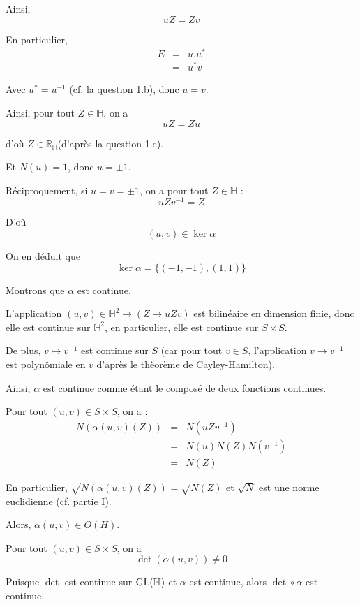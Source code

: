 Ainsi,
\[ u Z = Z v \]


En particulier,
\begin{eqnarray*}
  E & = & u.u^{\ast}\\
  & = & u^{\ast} v
\end{eqnarray*}


Avec $u^{\ast} = u^{- 1}$ (cf. la question 1.b), donc $u = v$.

Ainsi, pour tout $Z \in \mathbb{H}$, on a
\[ u Z = Z u \]


d'o{\`u} $Z \in \mathbb{R}_{\mathbb{H}} $(d'apr{\`e}s la question 1.c).

Et $N (u) = 1$, donc $u = \pm 1$.

R{\'e}ciproquement, si $u = v = \pm 1 $, on a pour tout $Z \in \mathbb{H}$ :
\[ u Z v^{- 1} = Z \]


D'o{\`u}
\[ (u, v) \in \ker \alpha \]


On en d{\'e}duit que
\[ \ker \alpha = \{ (- 1, - 1), (1, 1) \} \]


 Montrons que $\alpha$ est continue.

L'application $(u, v) \in \mathbb{H}^2 \longmapsto (Z \longmapsto u Z v)$ est
bilin{\'e}aire en dimension finie, donc elle est continue sur $\mathbb{H}^2$,
en particulier, elle est continue sur $S \times S$.

De plus, $v \longmapsto v^{- 1}$ est continue sur $S$ (car pour tout $v \in
S$, l'application $v \rightarrow v^{- 1}$ est polyn{\^o}miale en $v$
d'apr{\`e}s le th{\`e}or{\`e}me de Cayley-Hamilton).

Ainsi, $\alpha$ est continue comme {\'e}tant le compos{\'e} de deux fonctions
continues.

Pour tout $(u, v) \in S \times S$, on a :
\begin{eqnarray*}
  N (\alpha (u, v) (Z)) & = & N (u Z  v^{- 1})\\
  & = & N (u) N (Z) N (v^{- 1})\\
  & = & N (Z)
\end{eqnarray*}


En particulier, $\sqrt{N (\alpha (u, v) (Z))} = \sqrt{N (Z)}$ et $\sqrt{N}$
est une norme euclidienne (cf. partie I).

Alors, $\alpha (u, v) \in O (H)$.

Pour tout $(u, v) \in S \times S$, on a
\[ \det (\alpha (u, v)) \neq 0 \]


Puisque $\det$ est continue sur $\operatorname{GL} (\mathbb{H})$ et $\alpha$ est
continue, alors $\det \circ \alpha$ est continue.

